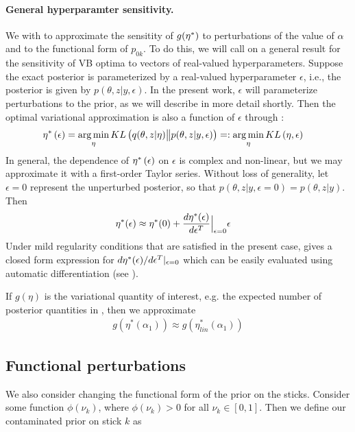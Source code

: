 
\paragraph{General hyperparamter sensitivity.}
We with to approximate the sensitity of $g(\eta^{*})$ to perturbations of the
value of $\alpha$ and to the functional form of $p_{0k}$.  To do this, we will
call on a general result for the sensitivity of VB optima to vectors of
real-valued hyperparameters.  Suppose the exact posterior is parameterized by a
real-valued hyperparameter $\epsilon$, i.e., the posterior is given by
$p\left(\theta, z \vert y, \epsilon\right)$. In the present work, $\epsilon$
will parameterize perturbations to the prior, as we will describe in more detail
shortly.  Then the optimal variational approximation is also a function of
$\epsilon$ through :
%
\begin{align}
    \eta^{*}\left(\epsilon\right) &=
    \operatorname*{arg\,min}_{\eta} KL\left(
        q(\theta, z \vert \eta) \big\| p(\theta, z | y, \epsilon) \right) =:
    \operatorname*{arg\,min}_{\eta} KL\left(\eta, \epsilon\right) \label{eq:pert_kl_objective}
\end{align}
%
In general, the dependence of $\eta^{*}\left(\epsilon\right)$ on $\epsilon$ is
complex and non-linear, but we may approximate it with a first-order Taylor
series. Without loss of generality, let $\epsilon=0$ represent the unperturbed
posterior, so that $p\left(\theta, z \vert y, \epsilon=0\right) = p\left(\theta,
z \vert y \right)$.  Then
%
\begin{align}
\eta^{*}(\epsilon) &\approx
 \eta^{*}(0) +
    \frac{d \eta^{*}(\epsilon)}{d\epsilon^T}\Big|_{\epsilon=0}
    \epsilon \label{eq:our_approximation}
\end{align}
%
Under mild regularity conditions that are satisfied in the present case,
\citet[Theorem 2]{giordano:2017:covariances} gives a closed form
expression for $d \eta^{*}(\epsilon)/ d\epsilon^T \vert_{\epsilon = 0}$
which can be easily evaluated using automatic differentiation
\citep{maclaurin:2015:autograd} (see ).

If $g(\eta)$ is the variational quantity of interest, e.g. the expected number
of posterior quantities in , then we
approximate
%
\begin{align}
    g(\eta^*(\alpha_1)) \approx g(\eta^*_{lin}(\alpha_1))
\end{align}

\subsection{Functional perturbations}
\label{sec:func_pert}
%
We also consider changing the functional form of the prior on the sticks.
Consider some function $\phi(\nu_k)$, where $\phi(\nu_k) > 0$ for all $\nu_k \in
[0, 1]$. Then we define our contaminated prior on stick $k$ as


